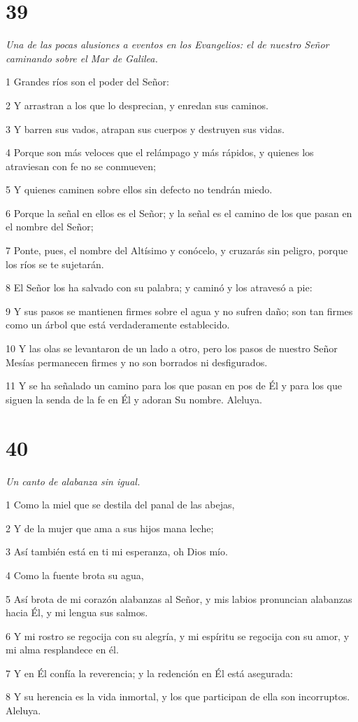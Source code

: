 \chapter{39}

\par \textit{Una de las pocas alusiones a eventos en los Evangelios: el de nuestro Señor caminando sobre el Mar de Galilea.}

\par 1 Grandes ríos son el poder del Señor:
\par 2 Y arrastran a los que lo desprecian, y enredan sus caminos.
\par 3 Y barren sus vados, atrapan sus cuerpos y destruyen sus vidas.
\par 4 Porque son más veloces que el relámpago y más rápidos, y quienes los atraviesan con fe no se conmueven;
\par 5 Y quienes caminen sobre ellos sin defecto no tendrán miedo.
\par 6 Porque la señal en ellos es el Señor; y la señal es el camino de los que pasan en el nombre del Señor;
\par 7 Ponte, pues, el nombre del Altísimo y conócelo, y cruzarás sin peligro, porque los ríos se te sujetarán.
\par 8 El Señor los ha salvado con su palabra; y caminó y los atravesó a pie:
\par 9 Y sus pasos se mantienen firmes sobre el agua y no sufren daño; son tan firmes como un árbol que está verdaderamente establecido.
\par 10 Y las olas se levantaron de un lado a otro, pero los pasos de nuestro Señor Mesías permanecen firmes y no son borrados ni desfigurados.
\par 11 Y se ha señalado un camino para los que pasan en pos de Él y para los que siguen la senda de la fe en Él y adoran Su nombre. Aleluya.

\chapter{40}

\par \textit{Un canto de alabanza sin igual.}

\par 1 Como la miel que se destila del panal de las abejas,
\par 2 Y de la mujer que ama a sus hijos mana leche;
\par 3 Así también está en ti mi esperanza, oh Dios mío.
\par 4 Como la fuente brota su agua,
\par 5 Así brota de mi corazón alabanzas al Señor, y mis labios pronuncian alabanzas hacia Él, y mi lengua sus salmos.
\par 6 Y mi rostro se regocija con su alegría, y mi espíritu se regocija con su amor, y mi alma resplandece en él.
\par 7 Y en Él confía la reverencia; y la redención en Él está asegurada:
\par 8 Y su herencia es la vida inmortal, y los que participan de ella son incorruptos. Aleluya.

